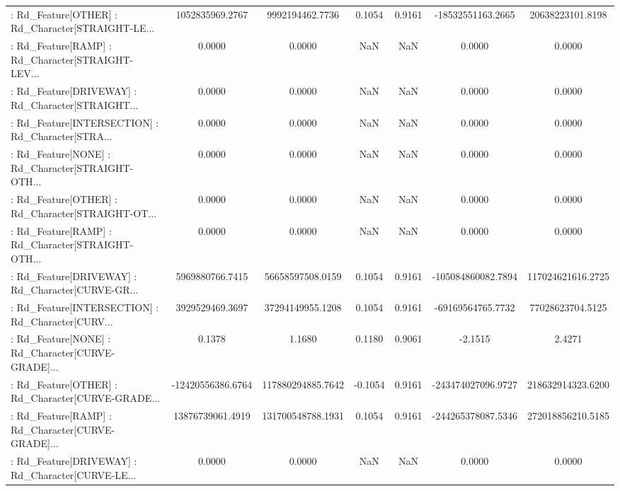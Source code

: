 \begin{longtable}{p{4cm}cccccc}
 : Rd\_Feature[OTHER] : Rd\_Character[STRAIGHT-LE... &   1052835969.2767 &   9992194462.7736 &  0.1054 &       0.9161 &  -18532551163.2665 &  20638223101.8198 \\
 : Rd\_Feature[RAMP] : Rd\_Character[STRAIGHT-LEV... &            0.0000 &            0.0000 &     NaN &          NaN &             0.0000 &            0.0000 \\
 : Rd\_Feature[DRIVEWAY] : Rd\_Character[STRAIGHT... &            0.0000 &            0.0000 &     NaN &          NaN &             0.0000 &            0.0000 \\
 : Rd\_Feature[INTERSECTION] : Rd\_Character[STRA... &            0.0000 &            0.0000 &     NaN &          NaN &             0.0000 &            0.0000 \\
 : Rd\_Feature[NONE] : Rd\_Character[STRAIGHT-OTH... &            0.0000 &            0.0000 &     NaN &          NaN &             0.0000 &            0.0000 \\
 : Rd\_Feature[OTHER] : Rd\_Character[STRAIGHT-OT... &            0.0000 &            0.0000 &     NaN &          NaN &             0.0000 &            0.0000 \\
 : Rd\_Feature[RAMP] : Rd\_Character[STRAIGHT-OTH... &            0.0000 &            0.0000 &     NaN &          NaN &             0.0000 &            0.0000 \\
 : Rd\_Feature[DRIVEWAY] : Rd\_Character[CURVE-GR... &   5969880766.7415 &  56658597508.0159 &  0.1054 &       0.9161 & -105084860082.7894 & 117024621616.2725 \\
 : Rd\_Feature[INTERSECTION] : Rd\_Character[CURV... &   3929529469.3697 &  37294149955.1208 &  0.1054 &       0.9161 &  -69169564765.7732 &  77028623704.5125 \\
 : Rd\_Feature[NONE] : Rd\_Character[CURVE-GRADE]... &            0.1378 &            1.1680 &  0.1180 &       0.9061 &            -2.1515 &            2.4271 \\
 : Rd\_Feature[OTHER] : Rd\_Character[CURVE-GRADE... & -12420556386.6764 & 117880294885.7642 & -0.1054 &       0.9161 & -243474027096.9727 & 218632914323.6200 \\
 : Rd\_Feature[RAMP] : Rd\_Character[CURVE-GRADE]... &  13876739061.4919 & 131700548788.1931 &  0.1054 &       0.9161 & -244265378087.5346 & 272018856210.5185 \\
 : Rd\_Feature[DRIVEWAY] : Rd\_Character[CURVE-LE... &            0.0000 &            0.0000 &     NaN &          NaN &             0.0000 &            0.0000 \\

\end{longtable}
